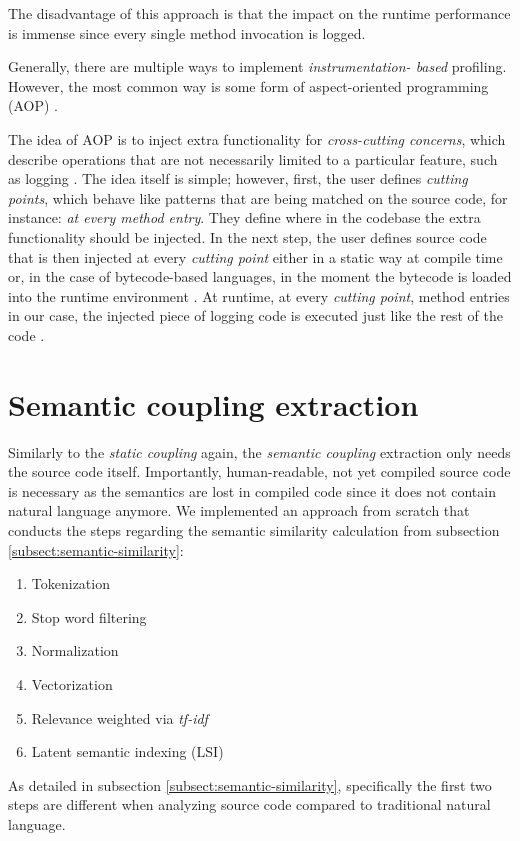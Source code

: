 \documentclass[12pt,a4paper]{report}
\begin{document}
The disadvantage of this approach is that the impact on the runtime performance
is immense since every single method invocation is logged.

Generally, there are multiple ways to implement \textit{instrumentation\hyp
based} profiling. However, the most common way is some form of aspect-oriented
programming (AOP) \cite{kiczales1997aop}.

The idea of AOP is to inject extra functionality for \textit{cross-cutting
concerns}, which describe operations that are not necessarily limited to a
particular feature, such as logging \cite{kiczales1997aop}. The idea itself is
simple; however, first, the user defines \textit{cutting points}, which behave
like patterns that are being matched on the source code, for instance: \textit{
at every method entry}. They define where in the codebase the extra
functionality should be injected. In the next step, the user defines source
code that is then injected at every \textit{cutting point} either in a static
way at compile time or, in the case of bytecode\hyp based languages, in the
moment the bytecode is loaded into the runtime environment \cite{
kiczales1997aop}. At runtime, at every \textit{cutting point}, method entries
in our case, the injected piece of logging code is executed just like the rest
of the code \cite{kiczales1997aop}.



\section{Semantic coupling extraction}

Similarly to the \textit{static coupling} again, the \textit{semantic coupling}
extraction only needs the source code itself. Importantly, human-readable, not
yet compiled source code is necessary as the semantics are lost in compiled
code since it does not contain natural language anymore. We implemented an
approach from scratch that conducts the steps regarding the semantic similarity
calculation from subsection \ref{subsect:semantic-similarity}:
\begin{enumerate}[noitemsep]
  \item Tokenization
  \item Stop word filtering
  \item Normalization
  \item Vectorization
  \item Relevance weighted via \textit{tf-idf}
  \item Latent semantic indexing (LSI)
\end{enumerate}
As detailed in subsection
\ref{subsect:semantic-similarity}, specifically the first two steps are
different when analyzing source code compared to traditional natural language.
\end{document}
